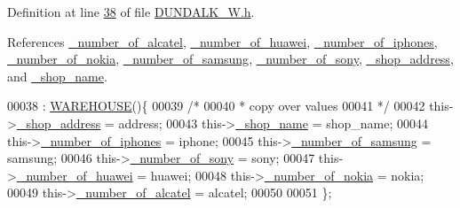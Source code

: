 Definition at line \hyperlink{_d_u_n_d_a_l_k___w_8h_source_l00038}{38} of file \hyperlink{_d_u_n_d_a_l_k___w_8h_source}{D\+U\+N\+D\+A\+L\+K\+\_\+\+W.\+h}.



References \hyperlink{_d_u_n_d_a_l_k___w_8h_source_l00116}{\+\_\+number\+\_\+of\+\_\+alcatel}, \hyperlink{_d_u_n_d_a_l_k___w_8h_source_l00114}{\+\_\+number\+\_\+of\+\_\+huawei}, \hyperlink{_d_u_n_d_a_l_k___w_8h_source_l00111}{\+\_\+number\+\_\+of\+\_\+iphones}, \hyperlink{_d_u_n_d_a_l_k___w_8h_source_l00115}{\+\_\+number\+\_\+of\+\_\+nokia}, \hyperlink{_d_u_n_d_a_l_k___w_8h_source_l00112}{\+\_\+number\+\_\+of\+\_\+samsung}, \hyperlink{_d_u_n_d_a_l_k___w_8h_source_l00113}{\+\_\+number\+\_\+of\+\_\+sony}, \hyperlink{_d_u_n_d_a_l_k___w_8h_source_l00109}{\+\_\+shop\+\_\+address}, and \hyperlink{_d_u_n_d_a_l_k___w_8h_source_l00110}{\+\_\+shop\+\_\+name}.


\begin{DoxyCode}
00038                                                                                                            
                       : \hyperlink{class_w_a_r_e_h_o_u_s_e_a7a924d389af91f54ed0e1d1d8d56ec57_a7a924d389af91f54ed0e1d1d8d56ec57}{WAREHOUSE}()\{
00039         \textcolor{comment}{/*}
00040 \textcolor{comment}{         * copy over values
}
00041 \textcolor{comment}{         */}
00042         this->\hyperlink{class_d_u_n_d_a_l_k___w_a84ef96f22ec520afc66bb26b0d264475_a84ef96f22ec520afc66bb26b0d264475}{\_shop\_address} = address;
00043         this->\hyperlink{class_d_u_n_d_a_l_k___w_ac9018980d31ba581cd83b07df0b171e2_ac9018980d31ba581cd83b07df0b171e2}{\_shop\_name} = shop\_name;
00044         this->\hyperlink{class_d_u_n_d_a_l_k___w_a82b528f661644166d93a5209524b4543_a82b528f661644166d93a5209524b4543}{\_number\_of\_iphones} = iphone;
00045         this->\hyperlink{class_d_u_n_d_a_l_k___w_afec98ddc022c03aaaaa2848e5ca7cfb3_afec98ddc022c03aaaaa2848e5ca7cfb3}{\_number\_of\_samsung} = samsung;
00046         this->\hyperlink{class_d_u_n_d_a_l_k___w_a9a40b513a6d4153a9a0f37ce47429369_a9a40b513a6d4153a9a0f37ce47429369}{\_number\_of\_sony} = sony;
00047         this->\hyperlink{class_d_u_n_d_a_l_k___w_a84781068676dee44cb4654706d8fec51_a84781068676dee44cb4654706d8fec51}{\_number\_of\_huawei} = huawei;
00048         this->\hyperlink{class_d_u_n_d_a_l_k___w_a8e794ecf0c55b5606a8f4a0ab214c657_a8e794ecf0c55b5606a8f4a0ab214c657}{\_number\_of\_nokia} = nokia;
00049         this->\hyperlink{class_d_u_n_d_a_l_k___w_a67a471ec2d409a309ebc179ff4d789bc_a67a471ec2d409a309ebc179ff4d789bc}{\_number\_of\_alcatel} = alcatel;
00050         
00051     \};
\end{DoxyCode}
